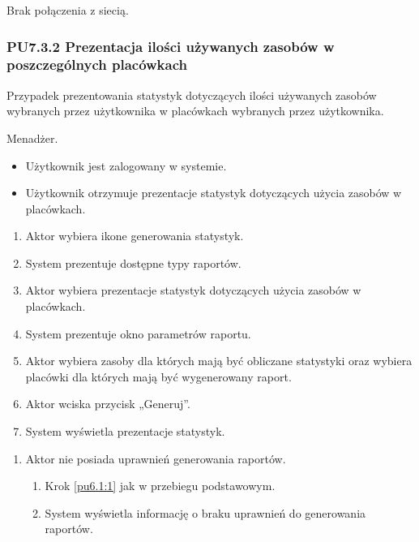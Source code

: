 Brak połączenia z siecią.

\subsubsection{PU7.3.2 Prezentacja ilości używanych zasobów w poszczególnych placówkach}
Przypadek prezentowania statystyk dotyczących ilości używanych zasobów wybranych przez użytkownika w placówkach wybranych przez użytkownika.

Menadżer.

\begin{itemize}
\item Użytkownik jest zalogowany w systemie.
\end{itemize}

\begin{itemize}
\item Użytkownik otrzymuje prezentacje statystyk dotyczących użycia zasobów w placówkach.
\end{itemize}

\begin{enumerate}
	\item \label{pu7.3.2:1} Aktor wybiera ikone generowania statystyk.
	\item System prezentuje dostępne typy raportów.
	\item \label{pu7.3.2:2} Aktor wybiera prezentacje statystyk dotyczących użycia zasobów w placówkach.
	\item System prezentuje okno parametrów raportu.
	\item Aktor wybiera zasoby dla których mają być obliczane statystyki oraz wybiera placówki dla których mają być wygenerowany raport.
	\item Aktor wciska przycisk „Generuj”.
	\item System wyświetla prezentacje statystyk.
\end{enumerate}

\begin{enumerate}
	\item Aktor nie posiada uprawnień generowania raportów.
	\begin{enumerate}[label*=\arabic*.]
		\item Krok \ref{pu6.1:1} jak w przebiegu podstawowym.
		\item System wyświetla informację o braku uprawnień do generowania raportów.
	\end{enumerate}
\end{enumerate}

